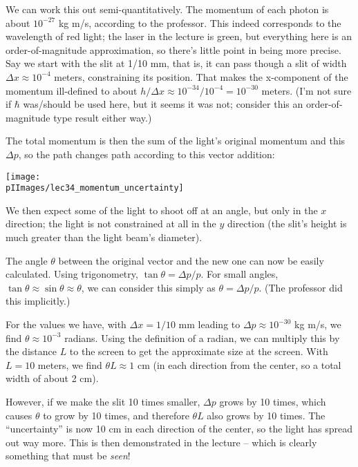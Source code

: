 We can work this out semi-quantitatively. The momentum of each photon is about $10^{-27}$ kg m/s, according to the professor. This indeed corresponds to the wavelength of red light; the laser in the lecture is green, but everything here is an order-of-magnitude approximation, so there's little point in being more precise.\\
Say we start with the slit at 1/10 mm, that is, it can pass though a slit of width $\Delta x \approx 10^{-4}$ meters, constraining its position. That makes the x-component of the momentum ill-defined to about $h/\Delta x \approx 10^{-34} / 10^{-4} = 10^{-30}$ meters. (I'm not sure if $\hbar$ was/should be used here, but it seems it was not; consider this an order-of-magnitude type result either way.)

The total momentum is then the sum of the light's original momentum and this $\Delta p$, so the path changes path according to this vector addition:

\begin{center}
\texttt{[image: \\pIImages/lec34\_momentum\_uncertainty]}
\end{center}

We then expect some of the light to shoot off at an angle, but only in the $x$ direction; the light is not constrained at all in the $y$ direction (the slit's height is much greater than the light beam's diameter).

The angle $\theta$ between the original vector and the new one can now be easily calculated. Using trigonometry, $\tan \theta = \Delta p / p$. For small angles, $\tan \theta \approx \sin \theta \approx \theta$, we can consider this simply as $\theta = \Delta p / p$. (The professor did this implicitly.)

For the values we have, with $\Delta x = 1/10$ mm leading to $\Delta p \approx 10^{-30}$ kg m/s, we find $\theta \approx 10^{-3}$ radians. Using the definition of a radian, we can multiply this by the distance $L$ to the screen to get the approximate size at the screen. With $L = 10$ meters, we find $\theta L \approx 1$ cm (in each direction from the center, so a total width of about 2 cm).

However, if we make the slit 10 times smaller, $\Delta p$ grows by 10 times, which causes $\theta$ to grow by 10 times, and therefore $\theta L$ also grows by 10 times. The ``uncertainty'' is now 10 cm in each direction of the center, so the light has spread out way more. This is then demonstrated in the lecture -- which is clearly something that must be \emph{seen}!

